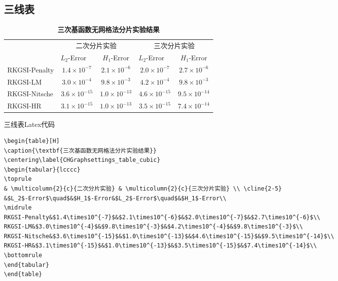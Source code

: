 \documentclass[engineeringmaster]{hquThesis}
\begin{document}
\subsection*{三线表}
\begin{table}[H]
    \caption{\textbf{三次基函数无网格法分片实验结果}}
    \centering\label{CHGraphsettings_table_cubic}
    \begin{tabular}{lcccc}
       \toprule
    & \multicolumn{2}{c}{二次分片实验} & \multicolumn{2}{c}{三次分片实验} \\ \cline{2-5}
       &$L_2$-Error$\quad$&$H_1$-Error&$L_2$-Error$\quad$&$H_1$-Error\\
       \midrule
      RKGSI-Penalty&$1.4\times10^{-7}$&$2.1\times10^{-6}$&$2.0\times10^{-7}$&$2.7\times10^{-6}$\\
      RKGSI-LM&$3.0\times10^{-4}$&$9.8\times10^{-3}$&$4.2\times10^{-4}$&$9.8\times10^{-3}$\\
      RKGSI-Nitsche&$3.6\times10^{-15}$&$1.0\times10^{-13}$&$4.6\times10^{-15}$&$9.5\times10^{-14}$\\
      RKGSI-HR&$3.1\times10^{-15}$&$1.0\times10^{-13}$&$3.5\times10^{-15}$&$7.4\times10^{-14}$\\
       \bottomrule
    \end{tabular}
    \end{table}
三线表Latex代码
\begin{lstlisting}
\begin{table}[H]
\caption{\textbf{三次基函数无网格法分片实验结果}}
\centering\label{CHGraphsettings_table_cubic}
\begin{tabular}{lcccc}
\toprule
& \multicolumn{2}{c}{二次分片实验} & \multicolumn{2}{c}{三次分片实验} \\ \cline{2-5}
&$L_2$-Error$\quad$&$H_1$-Error&$L_2$-Error$\quad$&$H_1$-Error\\
\midrule
RKGSI-Penalty&$1.4\times10^{-7}$&$2.1\times10^{-6}$&$2.0\times10^{-7}$&$2.7\times10^{-6}$\\
RKGSI-LM&$3.0\times10^{-4}$&$9.8\times10^{-3}$&$4.2\times10^{-4}$&$9.8\times10^{-3}$\\
RKGSI-Nitsche&$3.6\times10^{-15}$&$1.0\times10^{-13}$&$4.6\times10^{-15}$&$9.5\times10^{-14}$\\
RKGSI-HR&$3.1\times10^{-15}$&$1.0\times10^{-13}$&$3.5\times10^{-15}$&$7.4\times10^{-14}$\\
\bottomrule
\end{tabular}
\end{table}    
\end{lstlisting}
\end{document}
